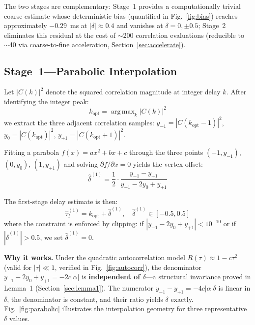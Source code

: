 \documentclass[a4paper,fleqn]{cas-dc}
\DeclareMathOperator*{\argmax}{arg\,max}
\begin{document}
The two stages are complementary: Stage~1 provides a computationally trivial coarse estimate whose deterministic bias (quantified in Fig.~\ref{fig:bias}) reaches approximately $-0.29$~ms at $|\delta|\approx0.4$ and vanishes at $\delta=0,\pm0.5$; Stage~2 eliminates this residual at the cost of $\sim$200 correlation evaluations (reducible to $\sim$40 via coarse-to-fine acceleration, Section~\ref{sec:accelerate}).

\subsection{Stage~1---Parabolic Interpolation}

Let $|C(k)|^2$ denote the squared correlation magnitude at integer delay $k$. After identifying the integer peak:
\begin{equation}
k_{\text{opt}} = \argmax_k |C(k)|^2
\label{eq:kopt}
\end{equation}
we extract the three adjacent correlation samples: $y_{-1} = |C(k_{\text{opt}}-1)|^2$, $y_0 = |C(k_{\text{opt}})|^2$, $y_{+1} = |C(k_{\text{opt}}+1)|^2$.

Fitting a parabola $f(x) = ax^2 + bx + c$ through the three points $(-1, y_{-1})$, $(0, y_0)$, $(1, y_{+1})$ and solving $\partial f/\partial x = 0$ yields the vertex offset:
\begin{equation}
\hat{\delta}^{(1)} = \frac{1}{2} \cdot \frac{y_{-1} - y_{+1}}{y_{-1} - 2y_0 + y_{+1}}
\label{eq:delta1}
\end{equation}

The first-stage delay estimate is then:
\begin{equation}
\hat{\tau}_l^{(1)} = k_{\text{opt}} + \hat{\delta}^{(1)}, \quad \hat{\delta}^{(1)} \in [-0.5, 0.5]
\label{eq:tau1}
\end{equation}
where the constraint is enforced by clipping: if $|y_{-1} - 2y_0 + y_{+1}| < 10^{-10}$ or if $|\hat{\delta}^{(1)}| > 0.5$, we set $\hat{\delta}^{(1)} = 0$.

\textbf{Why it works.} Under the quadratic autocorrelation model $R(\tau) \approx 1 - c\tau^2$ (valid for $|\tau| \ll 1$, verified in Fig.~\ref{fig:autocorr}), the denominator $y_{-1} - 2y_0 + y_{+1} = -2c|\alpha|$ is \textbf{independent of $\delta$}---a structural invariance proved in Lemma~1 (Section~\ref{sec:lemma1}). The numerator $y_{-1} - y_{+1} = -4c|\alpha|\delta$ is linear in $\delta$, the denominator is constant, and their ratio yields $\delta$ exactly. Fig.~\ref{fig:parabolic} illustrates the interpolation geometry for three representative $\delta$ values.
\end{document}
